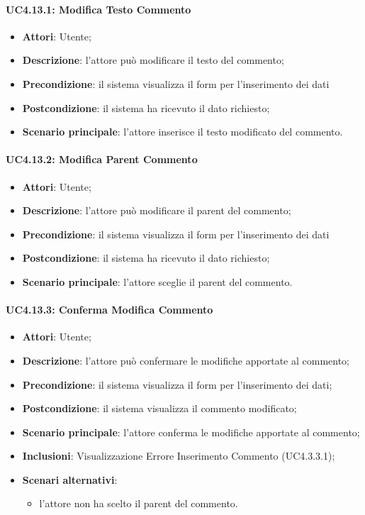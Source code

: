 \paragraph{UC4.13.1: Modifica Testo Commento}
\label{UC4.13.1}
\begin{itemize}
	\item \textbf{Attori}: Utente;
	\item \textbf{Descrizione}: l'attore può modificare il testo del commento;
	\item \textbf{Precondizione}: il sistema visualizza il form per l'inserimento dei dati
	\item \textbf{Postcondizione}: il sistema ha ricevuto il dato richiesto;
	\item \textbf{Scenario principale}: l'attore inserisce il testo modificato del commento.
\end{itemize}

\paragraph{UC4.13.2: Modifica Parent Commento}
\label{UC4.13.2}
\begin{itemize}
	\item \textbf{Attori}: Utente;
	\item \textbf{Descrizione}: l'attore può modificare il parent del commento;
	\item \textbf{Precondizione}: il sistema visualizza il form per l'inserimento dei dati
	\item \textbf{Postcondizione}: il sistema ha ricevuto il dato richiesto;
	\item \textbf{Scenario principale}: l'attore sceglie il parent del commento.
\end{itemize}

\paragraph{UC4.13.3: Conferma Modifica Commento}
\label{UC4.13.3}
\begin{itemize}
	\item \textbf{Attori}: Utente;
	\item \textbf{Descrizione}: l'attore può confermare le modifiche apportate al commento;
	\item \textbf{Precondizione}: il sistema visualizza il form per l'inserimento dei dati;
	\item \textbf{Postcondizione}: il sistema visualizza il commento modificato;
	\item \textbf{Scenario principale}: l'attore conferma le modifiche apportate al commento;
	\item \textbf{Inclusioni}:
	Visualizzazione Errore Inserimento Commento (UC4.3.3.1);
	\item \textbf{Scenari alternativi}:
	\begin{itemize}
	\item l'attore non ha scelto il parent del commento.
	\end{itemize}
\end{itemize}

